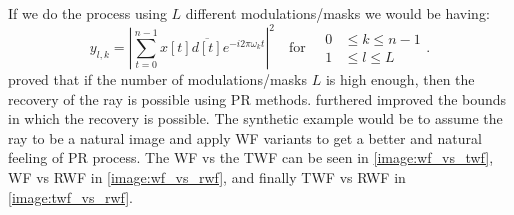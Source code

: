 If we do the process using $L$ different modulations/masks we would be having:
\begin{equation}\label{eq:l_modulation_effect}
	y_{l,k} = \left| \sum_{t=0}^{n-1} x[t]\overline{d[t]} e^{-i2\pi\omega_kt} \right|^2 \quad \text{for} \quad \begin{split}
	0 &\leq k \leq n-1\\
	1 &\leq l \leq L
	\end{split}
  .
  \end{equation}
\cite{ECXLMS2013} proved that if the number of modulations/masks $L$ is high enough, then the recovery of the ray is possible using \acl*{PR} methods. 
\cite{Gross2017} furthered improved the bounds in which the recovery is possible. The synthetic example would be to assume the ray to be a natural image and 
apply \ac{WF} variants to get a better and natural feeling of \acl*{PR} process. The \ac{WF} vs the \ac{TWF} can be seen in \cref{image:wf_vs_twf}, \ac{WF} vs \ac{RWF} in \cref{image:wf_vs_rwf}, and finally 
\ac{TWF} vs \ac{RWF} in \cref{image:twf_vs_rwf}.

